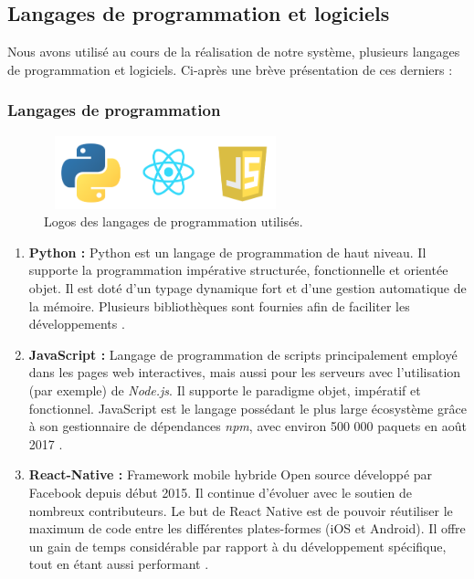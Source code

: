 \subsection{Langages de programmation et logiciels}
    Nous avons utilisé au cours de la réalisation de notre système, plusieurs langages de programmation et logiciels. Ci-après une brève présentation de ces derniers :
        \subsubsection{Langages de programmation}\label{react-native-def}
            \begin{figure}[H]
                    \centering
                    \includegraphics[height=60pt,width=200pt]{img/chapter4/tools/language.png}
                    \caption{Logos des langages de programmation utilisés.}
                    \label{}
            \end{figure}
            \begin{enumerate}[leftmargin=*]
                \item{\textbf{Python : }}
                Python est un langage de programmation de haut niveau. Il supporte la programmation impérative structurée, fonctionnelle et orientée objet. Il est doté d'un typage dynamique fort et d'une gestion automatique de la mémoire. Plusieurs bibliothèques sont fournies afin de faciliter les développements \cite{python}.\\

                \item{\textbf{JavaScript : }}
                Langage de programmation de scripts principalement employé dans les pages web interactives, mais aussi pour les serveurs avec l'utilisation (par exemple) de \emph{Node.js}. Il supporte le paradigme objet, impératif et fonctionnel. JavaScript est le langage possédant le plus large écosystème grâce à son gestionnaire de dépendances \emph{npm}, avec environ 500 000 paquets en août 2017 \cite{javascript}.\\

                \item{\textbf{React-Native : }}
                Framework mobile hybride Open source développé par Facebook depuis début 2015. Il continue d'évoluer avec le soutien de nombreux contributeurs. Le but de React Native est de pouvoir réutiliser le maximum de code entre les différentes plates-formes (iOS et Android). Il offre un gain de temps considérable par rapport à du développement spécifique, tout en étant aussi performant \cite{reactnative}.
            \end{enumerate}

